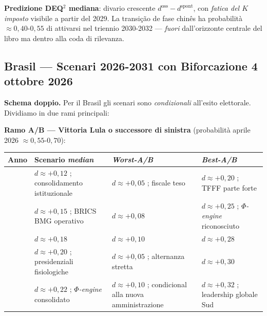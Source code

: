 \Conj{} \textbf{Predizione DEQ$^2$ mediana}: divario crescente
\(d^{\text{oss}} - d^{\text{spont}}\), con \emph{fatica del \(K\)
imposto} visibile a partir del 2029. La transição de fase chinês ha
probabilità \(\approx 0{,}40\)-\(0{,}55\) di attivarsi nel triennio
2030-2032 --- \emph{fuori} dall'orizzonte centrale del libro ma dentro
alla coda di rilevanza.

\subsection{Brasil --- Scenari 2026-2031 con Biforcazione 4 ottobre
2026}\label{brasile-scenari-2026-2031-con-bifurcação-4-ottobre-2026}

\Hypoth{} \textbf{Schema doppio.} Per il Brasil gli scenari sono
\emph{condizionali} all'esito elettorale. Dividiamo in due rami
principali:

\textbf{Ramo A/B --- Vittoria Lula o successore di sinistra}
(probabilità aprile 2026 \(\approx 0{,}55\)-\(0{,}70\)):

{\def\LTcaptype{none} %
{\small\begin{longtable}[]{@{}
  >{\raggedright\arraybackslash}p{}
  >{\raggedright\arraybackslash}p{}
  >{\raggedright\arraybackslash}p{}
  >{\raggedright\arraybackslash}p{}@{}}
\toprule\noalign{}
\begin{minipage}[b]{\linewidth}\raggedright
Anno
\end{minipage} & \begin{minipage}[b]{\linewidth}\raggedright
Scenario \emph{median}
\end{minipage} & \begin{minipage}[b]{\linewidth}\raggedright
\emph{Worst-A/B}
\end{minipage} & \begin{minipage}[b]{\linewidth}\raggedright
\emph{Best-A/B}
\end{minipage} \\
\midrule\noalign{}
\endhead
\bottomrule\noalign{}
\endlastfoot
2027 & \(d \approx +0{,}12\) ; consolidamento istituzionale &
\(d \approx +0{,}05\) ; fiscale teso & \(d \approx +0{,}20\) ; TFFF
parte forte \\
2028 & \(d \approx +0{,}15\) ; BRICS BMG operativo &
\(d \approx +0{,}08\) & \(d \approx +0{,}25\) ; \emph{$\Phi$-engine}
riconosciuto \\
2029 & \(d \approx +0{,}18\) & \(d \approx +0{,}10\) &
\(d \approx +0{,}28\) \\
2030 & \(d \approx +0{,}20\) ; presidenziali fisiologiche &
\(d \approx +0{,}05\) ; alternanza stretta & \(d \approx +0{,}30\) \\
2031 & \(d \approx +0{,}22\) ; \emph{$\Phi$-engine} consolidato &
\(d \approx +0{,}10\) ; condicional alla nuova amministrazione &
\(d \approx +0{,}32\) ; leadership globale Sud \\
\end{longtable}}
}


